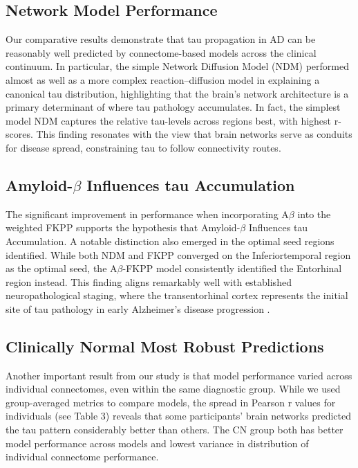 \subsection{Network Model Performance}
Our comparative results demonstrate that tau propagation in AD can be reasonably well predicted by connectome-based models across the clinical continuum. In particular, the simple Network Diffusion Model (NDM) performed almost as well as a more complex reaction–diffusion model in explaining a canonical tau distribution, highlighting that the brain’s network architecture is a primary determinant of where tau pathology accumulates. In fact, the simplest model NDM captures the relative tau-levels across regions best, with highest r-scores. This finding resonates with the view that brain networks serve as conduits for disease spread, constraining tau to follow connectivity routes. 

\subsection{Amyloid-$\beta$ Influences tau Accumulation}
The significant improvement in performance when incorporating A$\beta$ into the weighted FKPP supports the hypothesis that Amyloid-$\beta$ Influences tau Accumulation. A notable distinction also emerged in the optimal seed regions identified. While both NDM and FKPP converged on the Inferiortemporal region as the optimal seed, the A$\beta$-FKPP model consistently identified the Entorhinal region instead. This finding aligns remarkably well with established neuropathological staging, where the transentorhinal cortex represents the initial site of tau pathology in early Alzheimer's disease progression \citep{dominguez2018three}.

\subsection{Clinically Normal Most Robust Predictions}
Another important result from our study is that model performance varied across individual connectomes, even within the same diagnostic group. While we used group-averaged metrics to compare models, the spread in Pearson r values for individuals (see Table 3) reveals that some participants’ brain networks predicted the tau pattern considerably better than others. The CN group both has better model performance across models and lowest variance in distribution of individual connectome performance. 

